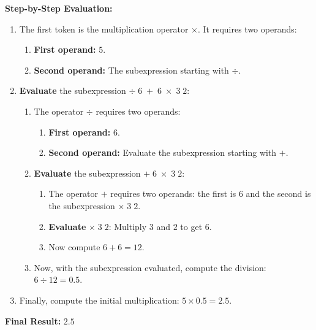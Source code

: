 \documentclass[12pt]{article}
\begin{document}
\textbf{Step-by-Step Evaluation:}
\begin{enumerate}[label=\textbf{Step \arabic*:}, leftmargin=*]
    \item The first token is the multiplication operator \(\times\). It requires two operands:
    \begin{enumerate}[label=\(\bullet\)]
        \item \textbf{First operand:} \(5\).
        \item \textbf{Second operand:} The subexpression starting with \(\div\).
    \end{enumerate}
    \item \textbf{Evaluate} the subexpression \(\div\; 6\; +\; 6\; \times\; 3\; 2\):
    \begin{enumerate}[label=\(\bullet\)]
        \item The operator \(\div\) requires two operands:
        \begin{enumerate}[label=\(\circ\)]
            \item \textbf{First operand:} \(6\).
            \item \textbf{Second operand:} Evaluate the subexpression starting with \(+\).
        \end{enumerate}
        \item \textbf{Evaluate} the subexpression \(+\; 6\; \times\; 3\; 2\):
        \begin{enumerate}[label=\(\circ\)]
            \item The operator \(+\) requires two operands: the first is \(6\) and the second is the subexpression \( \times\; 3\; 2\).
            \item \textbf{Evaluate} \(\times\; 3\; 2\): Multiply \(3\) and \(2\) to get \(6\).
            \item Now compute \(6 + 6 = 12\).
        \end{enumerate}
        \item Now, with the subexpression evaluated, compute the division: \(6 \div 12 = 0.5\).
    \end{enumerate}
    \item Finally, compute the initial multiplication: \(5 \times 0.5 = 2.5\).
\end{enumerate}

\textbf{Final Result:} \(\boxed{2.5}\)
\end{document}
